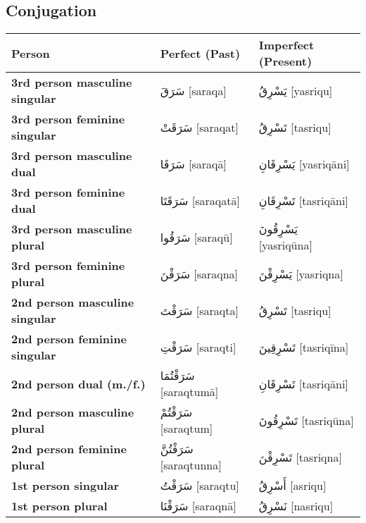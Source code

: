 \documentclass[letterpaper,12pt]{article}
\begin{document}
\subsection{Conjugation}
\begin{longtable}{|>{\raggedright}p{3.5cm}|p{5cm}|p{5cm}|}
\hline
\textbf{Person} & \textbf{Perfect (Past)} & \textbf{Imperfect (Present)} \\
\hline
\textbf{3rd person masculine singular} & \textarabic{سَرَقَ} [saraqa] & \textarabic{يَسْرِقُ} [yasriqu] \\
\hline
\textbf{3rd person feminine singular} & \textarabic{سَرَقَتْ} [saraqat] & \textarabic{تَسْرِقُ} [tasriqu] \\
\hline
\textbf{3rd person masculine dual} & \textarabic{سَرَقَا} [saraqā] & \textarabic{يَسْرِقَانِ} [yasriqāni] \\
\hline
\textbf{3rd person feminine dual} & \textarabic{سَرَقَتَا} [saraqatā] & \textarabic{تَسْرِقَانِ} [tasriqāni] \\
\hline
\textbf{3rd person masculine plural} & \textarabic{سَرَقُوا} [saraqū] & \textarabic{يَسْرِقُونَ} [yasriqūna] \\
\hline
\textbf{3rd person feminine plural} & \textarabic{سَرَقْنَ} [saraqna] & \textarabic{يَسْرِقْنَ} [yasriqna] \\
\hline
\textbf{2nd person masculine singular} & \textarabic{سَرَقْتَ} [saraqta] & \textarabic{تَسْرِقُ} [tasriqu] \\
\hline
\textbf{2nd person feminine singular} & \textarabic{سَرَقْتِ} [saraqti] & \textarabic{تَسْرِقِينَ} [tasriqīna] \\
\hline
\textbf{2nd person dual (m./f.)} & \textarabic{سَرَقْتُمَا} [saraqtumā] & \textarabic{تَسْرِقَانِ} [tasriqāni] \\
\hline
\textbf{2nd person masculine plural} & \textarabic{سَرَقْتُمْ} [saraqtum] & \textarabic{تَسْرِقُونَ} [tasriqūna] \\
\hline
\textbf{2nd person feminine plural} & \textarabic{سَرَقْتُنَّ} [saraqtunna] & \textarabic{تَسْرِقْنَ} [tasriqna] \\
\hline
\textbf{1st person singular} & \textarabic{سَرَقْتُ} [saraqtu] & \textarabic{أَسْرِقُ} [asriqu] \\
\hline
\textbf{1st person plural} & \textarabic{سَرَقْنَا} [saraqnā] & \textarabic{نَسْرِقُ} [nasriqu] \\
\hline
\end{longtable}
\end{document}
